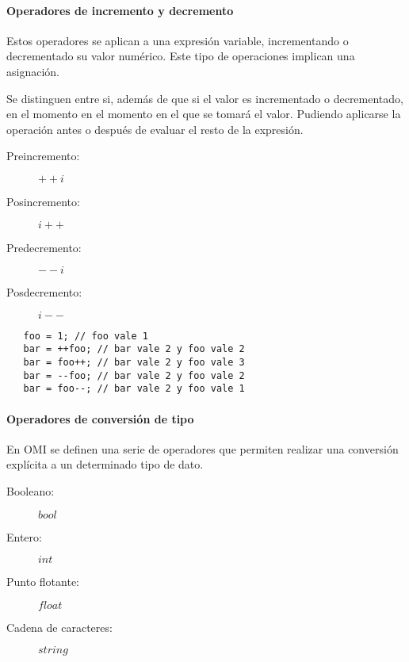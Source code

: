 \paragraph{Operadores de incremento y decremento} \label{sec:op_inc}
Estos operadores se aplican a una expresión variable, incrementando o decrementado su valor
numérico. Este tipo de operaciones implican una asignación. 

Se distinguen entre si, además de que si el valor es incrementado o decrementado, en el momento en el momento
en el que se tomará el valor. Pudiendo aplicarse la operación antes o después de evaluar el resto de la expresión.

\begin{description}
\item [Preincremento:] $++i$
\item [Posincremento:] $i++$
\item [Predecremento:] $--i$
\item [Posdecremento:] $i--$
\end{description} 


 \begin{lstlisting}
   foo = 1; // foo vale 1
   bar = ++foo; // bar vale 2 y foo vale 2
   bar = foo++; // bar vale 2 y foo vale 3
   bar = --foo; // bar vale 2 y foo vale 2
   bar = foo--; // bar vale 2 y foo vale 1
\end{lstlisting} 



\paragraph{Operadores de conversión de tipo} \label{sec:op_type}
En OMI se definen una serie de operadores que permiten realizar una conversión explícita a un determinado tipo de dato.

\begin{description}
\item [Booleano:] $bool$
\item [Entero:] $int$
\item [Punto flotante:] $float$
\item [Cadena de caracteres:] $string$
\end{description} 


